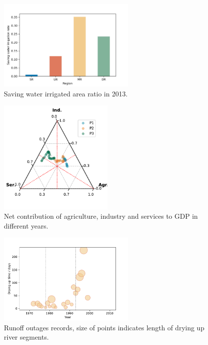 \documentclass[9pt,twoside,lineno]{pnas-new}
\begin{document}
\begin{figure}
    \centering
    \includegraphics[width=0.6\textwidth]{../../figures/sup/saving_water.jpg}
    \caption{
        Saving water irrigated area ratio in 2013.
    }
\end{figure}


\begin{figure}
    \centering
    \includegraphics[width=0.5\textwidth]{../../figures/sup/ternary.pdf}
    \caption{Net contribution of agriculture, industry and services to GDP in different years.}
\end{figure}


\begin{figure}
    \centering
    \includegraphics[width=0.6\textwidth]{../../figures/sup/outages.pdf}
    \caption{Runoff outages records, size of points indicates length of drying up river segments.}
\end{figure}
\end{document}

